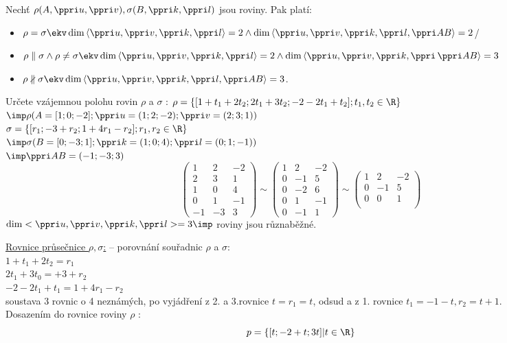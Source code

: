 Nechť $\rho (A,\ve u, \ve v),\sigma(B,\ve k,\ve l)$ jsou roviny. Pak platí:
\begin{itemize}
	\item $\rho = \sigma \ekv \dim\<\ve u,\ve v, \ve k, \ve l\> = 2 \land \dim \<\ve u , \ve v, \ve k ,\ve l, \ve {AB}\> =2$/
	\item $\rho \parallel \sigma \land \rho \neq \sigma \ekv\dim\<\ve u,\ve v, \ve k, \ve l\>= 2 \land \dim \<\ve u , \ve v, \ve k ,\ve \, \ve {AB}\> =3$ 
	\item $\rho \nparallel \sigma \ekv\dim \<\ve u , \ve v, \ve k ,\ve l, \ve {AB}\> =3$.
\end{itemize}
\Pr Určete vzájemnou polohu rovin $\rho$ a $\sigma$ : 
$\rho = \{ [1+t_1 + 2t_2; 2t_1 + 3 t_2 ; -2 -2t_1 + t_2];t_1,t_2\in\R\}$\\
$\imp \rho(A=[1;0;-2];\ve u = (1;2;-2);\ve v = (2;3;1))$ \\
$\sigma = \{ [r_1;-3+r_2;1+4r_1-r_2];r_1,r_2\in\R\}$\\
$\imp \sigma(B=[0;-3;1];\ve k = (1;0;4);\ve l = (0;1;-1))$ \\
$\imp \ve {AB} = (-1;-3;3)$
$$
\begin{pmatrix}
	1&2&-2\\
	2&3&1\\
	1&0&4\\
	0&1&-1\\
	-1&-3&3
\end{pmatrix}
\sim
\begin{pmatrix}
	1&2&-2\\
	0&-1&5\\
	0&-2&6\\
	0&1&-1\\
	0&-1&1
\end{pmatrix}
\sim
\begin{pmatrix}
	1&2&-2\\
	0&-1&5\\
	0&0&1\\
\end{pmatrix}
$$
$\dim<\ve u ,\ve v,\ve k,\ve l> = 3 \imp $ roviny jsou různaběžné.

\underline{Rovnice průsečnice $\rho, \sigma$:}
-- porovnání souřadnic $\rho$ a $\sigma$:\\
$1+t_1 + 2t_2 = r_1$\\
$2t_1+3t_0 = +3 + r_2$\\
$-2 - 2t_1 + t_1 = 1 + 4r_1 - r_2$\\
soustava 3 rovnic o 4 neznámých, po vyjádření z 2. a 3.rovnice $t=r_1 = t$, odsud a z 1. rovnice $t_1 = -1-t,r_2=t+1$.\\
Dosazením do rovnice roviny $\rho$ :\\
$$p =\{[t; - 2 + t; 3t]|t \in \R\}$$

